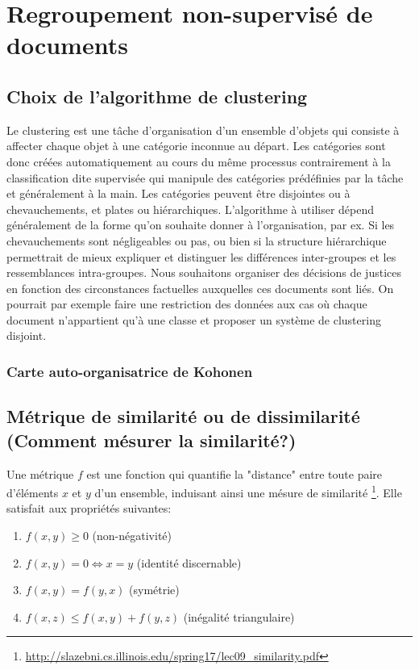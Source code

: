 \section{Regroupement non-supervisé de documents}
\label{sec:similarite:biblio}

\subsection{Choix de l’algorithme de clustering}

Le clustering est une tâche d’organisation d’un ensemble d’objets qui consiste à affecter chaque objet à une catégorie inconnue au départ. Les catégories sont donc créées automatiquement au cours du même processus contrairement à la classification dite supervisée qui manipule des catégories prédéfinies par la tâche et généralement à la main. Les catégories peuvent être disjointes ou à chevauchements, et plates ou hiérarchiques. 
L’algorithme à utiliser dépend généralement de la forme qu’on souhaite donner à l’organisation, par ex. Si les chevauchements sont négligeables ou pas, ou bien si la structure hiérarchique permettrait de mieux expliquer et distinguer les différences inter-groupes et les ressemblances intra-groupes. Nous souhaitons organiser des décisions de justices en fonction des circonstances factuelles auxquelles ces documents sont liés.  On pourrait par exemple faire une restriction des données aux cas où chaque document n’appartient qu’à une classe et proposer un système de clustering disjoint.

\subsubsection{Carte auto-organisatrice de Kohonen}


\subsection{Métrique de similarité ou de dissimilarité (Comment mésurer la similarité?)}
Une métrique $f$ est une fonction qui quantifie la "distance" entre toute paire d'éléments $x$ et $y$ d'un ensemble, induisant ainsi une mésure de similarité \footnote{\url{http://slazebni.cs.illinois.edu/spring17/lec09_similarity.pdf}}. Elle satisfait aux propriétés suivantes:
\begin{enumerate}
\item $f(x,y) \geq 0$ (non-négativité)
\item $f(x,y) = 0  \Leftrightarrow x = y$ (identité discernable)
\item $f(x,y) = f(y, x)$ (symétrie)
\item $f(x,z) \leq f(x,y) + f(y,z)$ (inégalité triangulaire) \label{enum:sim:ineq-tri}
\end{enumerate}


